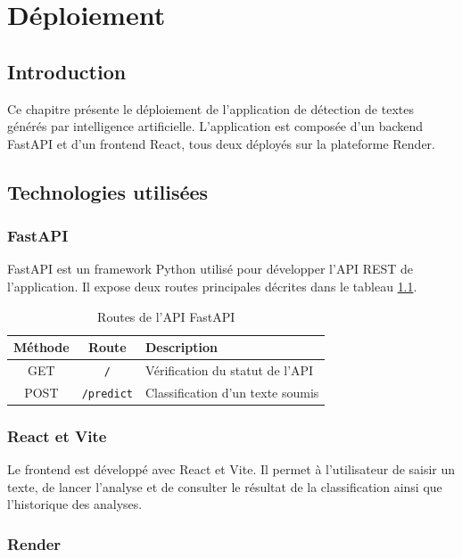 \chapter{Déploiement}

\section{Introduction}

Ce chapitre présente le déploiement de l'application de détection de textes générés
par intelligence artificielle. L'application est composée d'un backend FastAPI et
d'un frontend React, tous deux déployés sur la plateforme Render.

\section{Technologies utilisées}

\subsection{FastAPI}

FastAPI est un framework Python utilisé pour développer l'API REST de l'application.
Il expose deux routes principales décrites dans le tableau \ref{tab:api_routes}.

\begin{table}[H]
\centering
\renewcommand{\arraystretch}{1.4}
\begin{tabular}{|c|c|p{7cm}|}
\hline
\textbf{Méthode} & \textbf{Route} & \textbf{Description} \\
\hline
GET  & \texttt{/}        & Vérification du statut de l'API \\
\hline
POST & \texttt{/predict} & Classification d'un texte soumis \\
\hline
\end{tabular}
\caption{Routes de l'API FastAPI}
\label{tab:api_routes}
\end{table}

\subsection{React et Vite}

Le frontend est développé avec React et Vite. Il permet à l'utilisateur de saisir
un texte, de lancer l'analyse et de consulter le résultat de la classification
ainsi que l'historique des analyses.

\subsection{Render}

